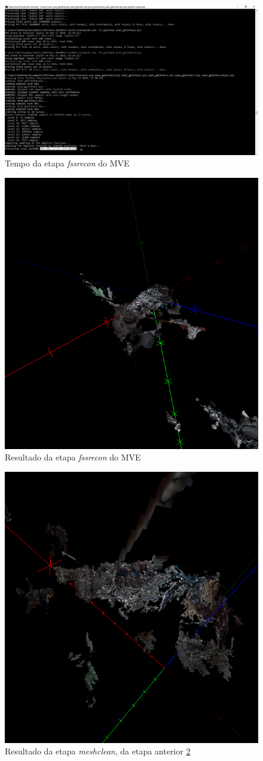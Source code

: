 \begin{figure}[!h]
	\centering
	\includegraphics[width=0.5\linewidth]{figs/mvefssrecongalinha.png}
	\caption{%
	Tempo da etapa {\it fssrecon} do MVE
	}\label{fig:fssrecon}
\end{figure}

\begin{figure}[!h]
	\centering
	\includegraphics[width=0.5\linewidth]{figs/galinhadmr.png}
	\caption{%
	Resultado da etapa {\it fssrecon} do MVE
	}\label{fig:galinhaFssr}
\end{figure}

\begin{figure}[!h]
	\centering
	\includegraphics[width=0.5\linewidth]{figs/galinhameshclean.png}
	\caption{%
	Resultado da etapa {\it meshclean}, da etapa anterior \ref{fig:galinhaFssr}
	}\label{fig:galinhaMeshClean}
\end{figure}

